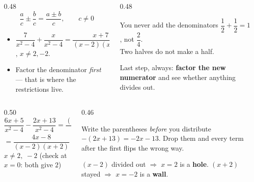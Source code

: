 \documentclass[aspectratio=169, 11pt]{beamer}
\begin{document}
\begin{frame}[t, plain]
  \begin{columns}[T]
    \begin{column}{0.48\textwidth}
      \[ \frac{a}{c}\pm\frac{b}{c}=\frac{a\pm b}{c}, \qquad c\neq0 \]
      \begin{itemize}\setlength{\itemsep}{4pt}
        \item $\dfrac{7}{x^2-4}+\dfrac{x}{x^2-4}=\dfrac{x+7}{(x-2)(x+2)}$, \; $x\neq2,-2$.
        \item Factor the denominator \emph{first} --- that is where the restrictions live.
      \end{itemize}
    \end{column}
    \begin{column}{0.48\textwidth}
      \begin{block}{You never add the denominators}
        $\dfrac12+\dfrac12=1$, not $\dfrac{2}{4}$. \\[3pt]
        Two halves do not make a half.
      \end{block}
      \vspace{3pt}
      {\footnotesize Last step, always: \textbf{factor the new numerator} and see whether anything
      divides out.}
    \end{column}
  \end{columns}
\end{frame}

\begin{frame}[t, plain]
  \begin{columns}[T]
    \begin{column}{0.50\textwidth}
      \[ \frac{6x+5}{x^2-4}-\frac{2x+13}{x^2-4}
         =\frac{(6x+5)-(2x+13)}{(x-2)(x+2)} \]
      \[ =\frac{4x-8}{(x-2)(x+2)}=\frac{4(x-2)}{(x-2)(x+2)}=\frac{4}{x+2} \]
      \centering $x\neq2,\;-2$ \quad (check at $x=0$: both give $2$)
    \end{column}
    \begin{column}{0.46\textwidth}
      \begin{block}{Write the parentheses \emph{before} you distribute}
        $-(2x+13)=-2x-13$. Drop them and every term after the first flips the wrong way.
      \end{block}
      \vspace{3pt}
      {\footnotesize $(x-2)$ divided out $\Rightarrow$ $x=2$ is a \textbf{hole}. $(x+2)$ stayed
      $\Rightarrow$ $x=-2$ is a \textbf{wall}.}
    \end{column}
  \end{columns}
\end{frame}
\end{document}
